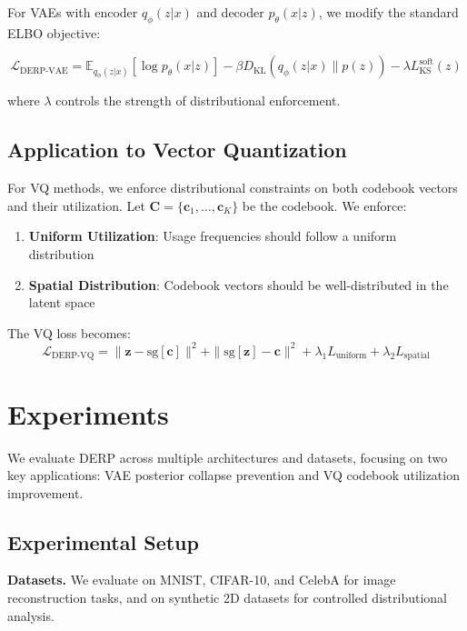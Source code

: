 \documentclass{article}
\begin{document}
For VAEs with encoder $q_{\phi}(z|x)$ and decoder $p_{\theta}(x|z)$, we modify the standard ELBO objective:

\begin{equation}
\mathcal{L}_{\text{DERP-VAE}} = \mathbb{E}_{q_{\phi}(z|x)}[\log p_{\theta}(x|z)] - \beta D_{\text{KL}}(q_{\phi}(z|x) \| p(z)) - \lambda L_{\text{KS}}^{\text{soft}}(z)
\end{equation}

where $\lambda$ controls the strength of distributional enforcement.

\subsection{Application to Vector Quantization}

For VQ methods, we enforce distributional constraints on both codebook vectors and their utilization. Let $\mathbf{C} = \{\mathbf{c}_1, \ldots, \mathbf{c}_K\}$ be the codebook. We enforce:

\begin{enumerate}
\item \textbf{Uniform Utilization}: Usage frequencies should follow a uniform distribution
\item \textbf{Spatial Distribution}: Codebook vectors should be well-distributed in the latent space
\end{enumerate}

The VQ loss becomes:
\begin{equation}
\mathcal{L}_{\text{DERP-VQ}} = \|\mathbf{z} - \text{sg}[\mathbf{c}]\|^2 + \|\text{sg}[\mathbf{z}] - \mathbf{c}\|^2 + \lambda_1 L_{\text{uniform}} + \lambda_2 L_{\text{spatial}}
\end{equation}

\section{Experiments}

We evaluate DERP across multiple architectures and datasets, focusing on two key applications: VAE posterior collapse prevention and VQ codebook utilization improvement.

\subsection{Experimental Setup}

\textbf{Datasets.} We evaluate on MNIST, CIFAR-10, and CelebA for image reconstruction tasks, and on synthetic 2D datasets for controlled distributional analysis.
\end{document}
